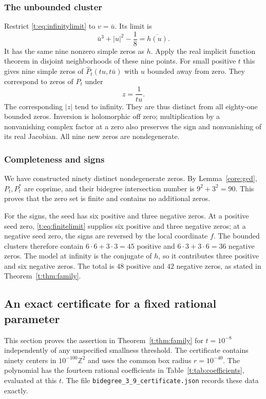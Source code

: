 \documentclass[UTF8,11pt]{ctexart}
\theoremstyle{definition}
\numberwithin{equation}{section}
\begin{document}
\subsubsection{The unbounded cluster}
Restrict \eqref{t:eq:infinitylimit} to $v=\bar u$. Its limit is
\[
 \bar u^3+|u|^2-\frac18=\overline{h(u)}.
\]
It has the same nine nonzero simple zeros as $h$.
Apply the real implicit function theorem in disjoint neighborhoods
of these nine points. For small positive $t$ this gives nine simple
zeros of $\widehat P_t(tu,t\bar u)$ with $u$ bounded away from zero.
They correspond to zeros of $P_t$ under
\[
 z=\frac1{tu}.
\]
The corresponding $|z|$ tend to infinity. They are thus distinct from
all eighty-one bounded zeros. Inversion is holomorphic off zero;
multiplication by a nonvanishing complex factor at a zero also
preserves the sign and nonvanishing of its real Jacobian. All nine
new zeros are nondegenerate.

\subsubsection{Completeness and signs}
We have constructed ninety distinct nondegenerate zeros. By
Lemma~\ref{core:gcd}, $P_t,P_t^*$ are coprime, and their bidegree
intersection number is $9^2+3^2=90$. This proves that the zero set is
finite and contains no additional zeros.

For the signs, the seed has six positive and three negative zeros.
At a positive seed zero, \eqref{t:eq:finitelimit} supplies six positive
and three negative zeros; at a negative seed zero, the signs are
reversed by the local coordinate $f$. The bounded clusters therefore
contain $6\cdot6+3\cdot3=45$ positive and
$6\cdot3+3\cdot6=36$ negative zeros. The model at infinity is the
conjugate of $h$, so it contributes three positive and six negative
zeros. The total is $48$ positive and $42$ negative zeros, as stated
in Theorem~\ref{t:thm:family}.

\subsection{An exact certificate for a fixed rational parameter}\label{t:sec:certificate}

This section proves the assertion in Theorem~\ref{t:thm:family} for
$t=10^{-8}$ independently of any unspecified smallness threshold.
The certificate contains ninety centers in $10^{-100}\mathbb Z^2$
and uses the common box radius $r=10^{-40}$. The polynomial has the
fourteen rational coefficients in Table~\ref{t:tab:coefficients},
evaluated at this $t$. The file
\texttt{bidegree\_3\_9\_certificate.json} records these data exactly.
\end{document}
